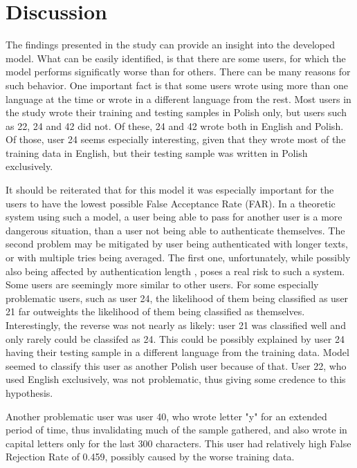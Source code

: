 \section{Discussion}
The findings presented in the study can provide an insight into the developed model. What can be easily identified, is that there are some users, for which the model performs significatly worse than for others. There can be many reasons for such behavior. One important fact is that some users wrote using more than one language at the time or wrote in a different language from the rest. Most users in the study wrote their training and testing samples in Polish only, but users such as 22, 24 and 42 did not. Of these, 24 and 42 wrote both in English and Polish. Of those, user 24 seems especially interesting, given that they wrote most of the training data in English, but their testing sample was written in Polish exclusively.

It should be reiterated that for this model it was especially important for the users to have the lowest possible False Acceptance Rate (FAR). In a theoretic system using such a model, a user being able to pass for another user is a more dangerous situation, than a user not being able to authenticate themselves. The second problem may be mitigated by user being authenticated with longer texts, or with multiple tries being averaged. The first one, unfortunately, while possibly also being affected by authentication length , poses a real risk to such a system. Some users are seemingly more similar to other users. For some especially problematic users, such as user 24, the likelihood of them being classified as user 21 far outweights the likelihood of them being classified as themselves. Interestingly, the reverse was not nearly as likely: user 21 was classified well and only rarely could be classifed as 24. This could be possibly explained by user 24 having their testing sample in a different language from the training data. Model seemed to classify this user as another Polish user because of that. User 22, who used English exclusively, was not problematic, thus giving some credence to this hypothesis.

Another problematic user was user 40, who wrote letter "y" for an extended period of time, thus invalidating much of the sample gathered, and also wrote in capital letters only for the last 300 characters. This user had relatively high False Rejection Rate of 0.459, possibly caused by the worse training data.

